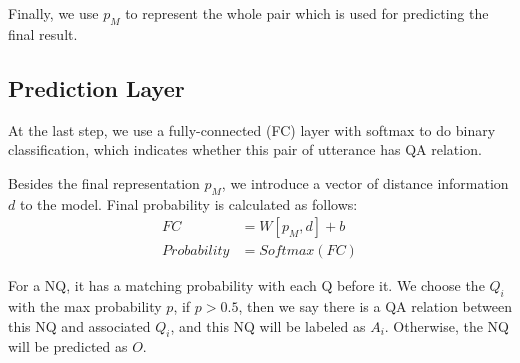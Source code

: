 Finally, we use $p_M$ to represent the whole pair which is used for predicting the final result.

\subsection{Prediction Layer }
At the last step, we use a fully-connected (FC) layer with softmax to do binary classification, which indicates whether this pair of utterance has QA relation.

Besides the final representation $p_M$, we introduce a vector of distance information $d$ to the model. Final probability is calculated as follows:
\begin{equation}
\begin{aligned}
FC&=W[p_M,d]+b\\
Probability&=Softmax(FC)
\end{aligned}
\end{equation}

For a NQ, it has a matching probability with each Q before it. We choose the $Q_{i}$ with the max probability $p$, if $p>0.5$, then we say there is a QA relation between this NQ and associated $Q_{i}$, and this NQ will be labeled as $A_i$. Otherwise, the NQ will be predicted as $O$. 






